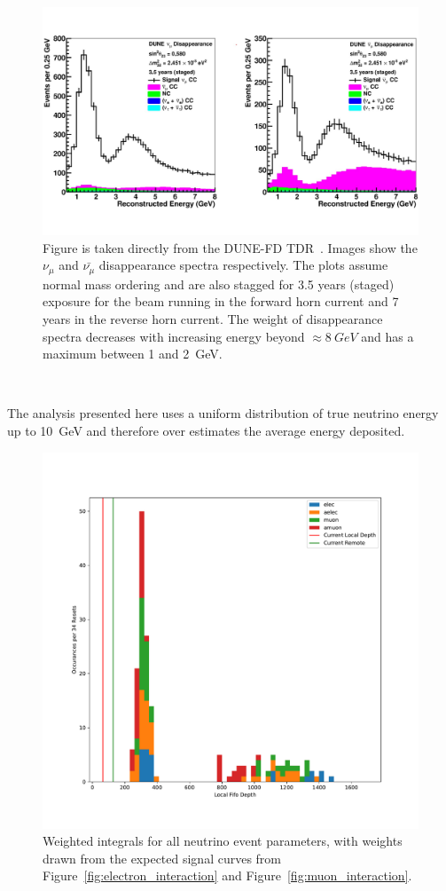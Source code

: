 \begin{figure}[]
\centering
\includegraphics[width=\textwidth]{images/tdr_muon_reconstruction_tdrv2.pdf}
\caption{Figure is taken directly from the DUNE-FD TDR~\citep{DUNE_FD_TDRv2_2020}.
Images show the $\nu_{\mu}$ and $\bar{\nu_{\mu}}$ disappearance spectra respectively.
The plots assume normal mass ordering and are also stagged for 3.5 years (staged) exposure for the beam running in the forward horn current and 7 years in the reverse horn current.
The weight of disappearance spectra decreases with increasing energy beyond $\approx 8~\unit{GeV}$ and has a maximum between 1 and 2~\unit{GeV}.
}
\end{figure}~\label{fig:muon_interaction}

The analysis presented here uses a uniform distribution of true neutrino energy up to 10~\unit{GeV} and therefore over estimates the average energy deposited.

\begin{figure}[]
\centering
\includegraphics[width=\textwidth]{images/df_weight_pdg_cut.pdf}
\caption{Weighted integrals for all neutrino event parameters, with weights drawn from the expected signal curves from Figure~\ref{fig:electron_interaction} and Figure~\ref{fig:muon_interaction}.}
\end{figure}~\label{fig:weighted_integrals}